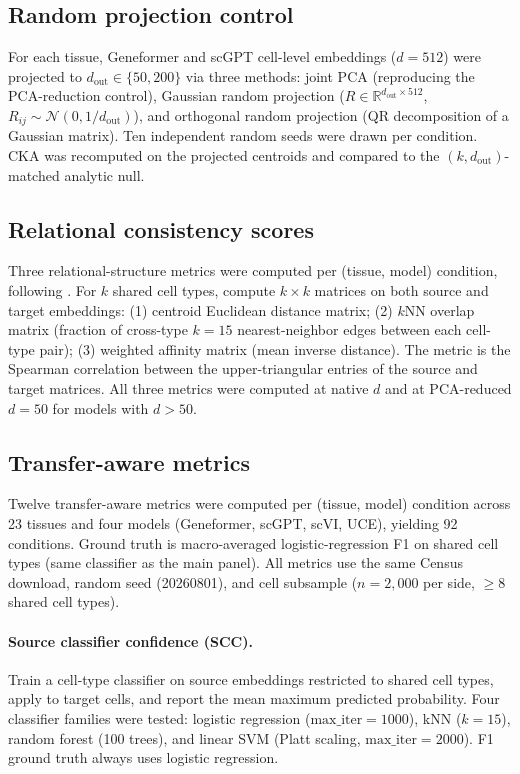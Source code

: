 \documentclass[11pt]{article}
\newcommand{\R}{\mathbb{R}}
\begin{document}
\subsection{Random projection control}
\label{sec:randprojmethod}

For each tissue, Geneformer and scGPT cell-level embeddings ($d = 512$)
were projected to $d_{\mathrm{out}} \in \{50, 200\}$ via three methods:
joint PCA (reproducing the PCA-reduction control), Gaussian random
projection ($R \in \R^{d_{\mathrm{out}} \times 512}$,
$R_{ij} \sim \mathcal{N}(0, 1/d_{\mathrm{out}})$), and orthogonal
random projection (QR decomposition of a Gaussian matrix). Ten
independent random seeds were drawn per condition. CKA was recomputed on
the projected centroids and compared to the
$(k, d_{\mathrm{out}})$-matched analytic null.

\subsection{Relational consistency scores}
\label{sec:scgraphmethod}

Three relational-structure metrics were computed per (tissue, model)
condition, following \citet{wang2026scgraph}. For $k$ shared cell types,
compute $k \times k$ matrices on both source and target embeddings: (1)
centroid Euclidean distance matrix; (2) $k$NN overlap matrix (fraction
of cross-type $k = 15$ nearest-neighbor edges between each cell-type
pair); (3) weighted affinity matrix (mean inverse distance). The metric
is the Spearman correlation between the upper-triangular entries of the
source and target matrices. All three metrics were computed at native $d$
and at PCA-reduced $d = 50$ for models with $d > 50$.

\subsection{Transfer-aware metrics}
\label{sec:sccmethod}

Twelve transfer-aware metrics were computed per (tissue, model) condition
across 23 tissues and four models (Geneformer, scGPT, scVI, UCE), yielding
92 conditions. Ground truth is macro-averaged logistic-regression F1 on
shared cell types (same classifier as the main panel). All metrics use
the same Census download, random seed (20260801), and cell subsample
($n = 2{,}000$ per side, $\geq 8$ shared cell types).

\paragraph{Source classifier confidence (SCC).} Train a cell-type
classifier on source embeddings restricted to shared cell types, apply
to target cells, and report the mean maximum predicted probability.
Four classifier families were tested: logistic regression
($\text{max\_iter} = 1000$), kNN ($k = 15$), random forest (100 trees),
and linear SVM (Platt scaling, $\text{max\_iter} = 2000$). F1 ground
truth always uses logistic regression.
\end{document}
